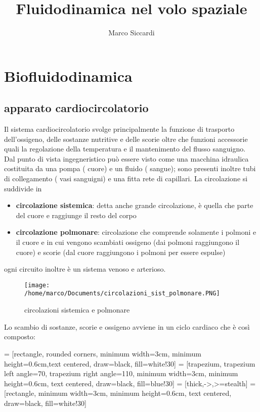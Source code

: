 \documentclass[10pt]{article}
\title{Fluidodinamica nel volo spaziale}								%
\author{Marco Siccardi}								%
\date{}											%
\begin{document}
\tableofcontents
\listoffigures
\pagebreak




\section{Biofluidodinamica}
\subsection{apparato cardiocircolatorio}
Il sistema cardiocircolatorio svolge principalmente la funzione di trasporto dell'ossigeno, delle sostanze nutritive e delle scorie oltre che funzioni accessorie quali la regolazione della temperatura e il mantenimento del flusso sanguigno.
\\Dal punto di vista ingegneristico può essere visto come una macchina idraulica costituita da una pompa
( cuore) e un fluido ( sangue); sono presenti inoltre tubi di collegamento ( vasi sanguigni) e una fitta rete di capillari.
La circolazione si suddivide in 
\begin{itemize}
    \item \textbf{circolazione sistemica}: detta anche grande circolazione, è quella che parte del cuore e raggiunge il resto del corpo
    \item \textbf{circolazione polmonare}: circolazione che comprende solamente i polmoni e il cuore e in cui vengono scambiati ossigeno (dai polmoni raggiungono il cuore) e scorie (dal cuore raggiungono i polmoni per essere espulse)
\end{itemize}
ogni circuito inoltre è un sistema venoso e arterioso.
\begin{figure}[h]
\centering
\texttt{[image: /home/marco/Documents/circolazioni\_sist\_polmonare.PNG]}
\caption{circolazioni sistemica e polmonare}
\label{fig:circolazioni}
\end{figure}
Lo scambio di sostanze, scorie e ossigeno avviene in un ciclo cardiaco che è così composto:

 = [rectangle, rounded corners, minimum width=3cm, minimum height=0.6cm,text centered, draw=black, fill=white!30]
 = [trapezium, trapezium left angle=70, trapezium right angle=110, minimum width=3cm, minimum height=0.6cm, text centered, draw=black, fill=blue!30]
 = [thick,->,>=stealth]
 = [rectangle, minimum width=3cm, minimum height=0.6cm, text centered, draw=black, fill=white!30]
\end{document}
